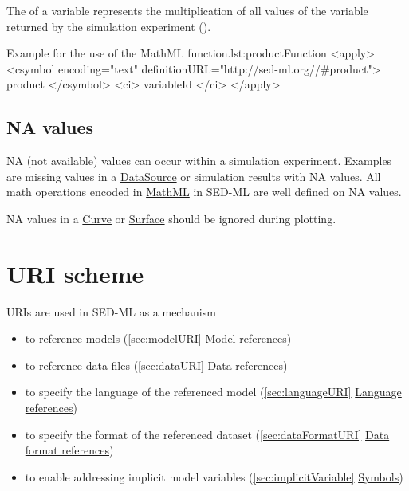 \subsubsection*{}
\label{fun:product}
The  of a variable represents the multiplication of all values of the variable returned by the simulation experiment ().
\begin{myXmlLst}{Example for the use of the MathML  function.}{lst:productFunction}
<apply>
 	<csymbol encoding="text" definitionURL="http://sed-ml.org//#product">
 		product
 	</csymbol>
 	<ci> variableId </ci>
</apply>
\end{myXmlLst}

\subsection{NA values}
NA (not available) values can occur within a simulation experiment. Examples are missing values in a \hyperref[class:dataSource]{DataSource} or simulation results with NA values. All math operations encoded in \hyperref[sec:mathML]{MathML} in SED-ML are well defined on NA values. 

NA values in a \hyperref[class:curve]{Curve} or \hyperref[class:surface]{Surface} should be ignored during plotting.
  
\section{URI scheme}  
\label{sec:uriScheme}
URIs are used in SED-ML as a mechanism
\begin{itemize}
	\item to reference models (\ref{sec:modelURI} \hyperref[sec:modelURI]{Model references})
	\item to reference data files (\ref{sec:dataURI} \hyperref[sec:dataURI]{Data references})
	\item to specify the language of the referenced model (\ref{sec:languageURI} \hyperref[sec:languageURI]{Language references})
	\item to specify the format of the referenced dataset (\ref{sec:dataFormatURI} \hyperref[sec:dataFormatURI]{Data format references})
	\item to enable addressing implicit model variables (\ref{sec:implicitVariable}  \hyperref[sec:implicitVariable]{Symbols})
\end{itemize}

